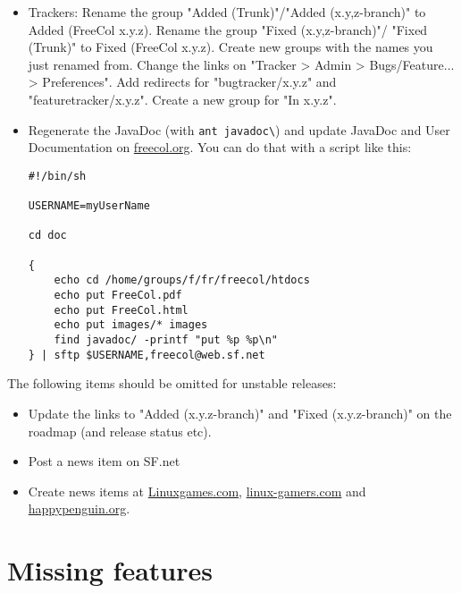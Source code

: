 \documentclass[12pt]{book}
\begin{document}
\begin{itemize}

\item Trackers: Rename the group "Added (Trunk)"/"Added (x.y,z-branch)" to
  Added (FreeCol x.y.z). Rename the group "Fixed (x.y,z-branch)"/
  "Fixed (Trunk)" to Fixed (FreeCol x.y.z). Create new groups with the
  names you just renamed from. Change the links on "Tracker > Admin >
  Bugs/Feature... > Preferences". Add redirects for "bugtracker/x.y.z"
  and "featuretracker/x.y.z". Create a new group for "In x.y.z".

\item Regenerate the JavaDoc (with \verb+ant javadoc\+) and update
  JavaDoc and User Documentation on
  \href{freecol.org}{freecol.org}. You can do that with a script like
  this:

\begin{verbatim}
#!/bin/sh

USERNAME=myUserName

cd doc

{
    echo cd /home/groups/f/fr/freecol/htdocs
    echo put FreeCol.pdf
    echo put FreeCol.html
    echo put images/* images
    find javadoc/ -printf "put %p %p\n"
} | sftp $USERNAME,freecol@web.sf.net

\end{verbatim}



\end{itemize}

The following items should be omitted for unstable releases:

\begin{itemize}

\item Update the links to "Added (x.y.z-branch)" and "Fixed
  (x.y.z-branch)" on the roadmap (and release status etc).

\item Post a news item on SF.net

\item Create news items at \href{Linuxgames.com}{Linuxgames.com},
  \href{linux-gamers.com}{linux-gamers.com} and
  \href{happypenguin.org}{happypenguin.org}.

\end{itemize}


\hypertarget{Missing features}{\chapter{Missing features}}
\end{document}

